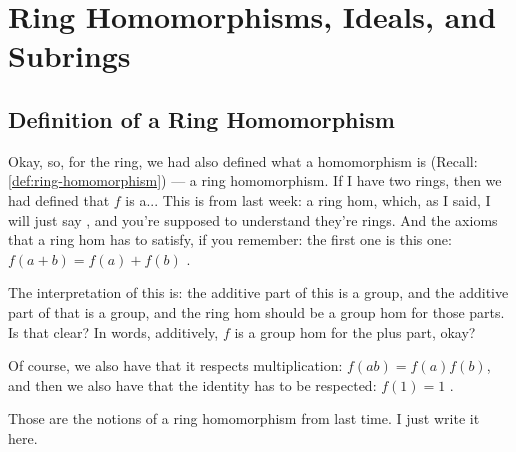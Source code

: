 \section{Ring Homomorphisms, Ideals, and Subrings}

\subsection{Definition of a Ring Homomorphism}

\begin{speech}[00:29:39 - 00:31:07]
Okay, so, for the ring,  we had also defined what a homomorphism is (Recall: \cref{def:ring-homomorphism}) --- a ring homomorphism. If I have two rings,  then we had defined that $f$ is a... This is from last week: a ring hom,  which, as I said, I will just say , and you're supposed to understand they're rings. And the axioms that a ring hom has to satisfy, if you remember: the first one is this one: $f(a + b) = f(a) + f(b)$ .

The interpretation of this is: the additive part of this is a group, and the additive part of that is a group, and the ring hom should be a group hom for those parts. Is that clear? In words, additively, $f$ is a group hom for the plus part, okay? 

Of course, we also have that it respects multiplication: $f(ab) = f(a)f(b)$,  and then we also have that the identity has to be respected: $f(1) = 1$ .

Those are the notions of a ring homomorphism from last time. I just write it here.
\end{speech}

